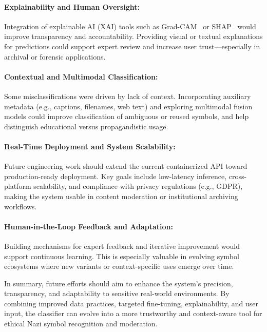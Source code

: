 \paragraph{Explainability and Human Oversight:}
Integration of explainable AI (XAI) tools such as
\ac{Grad-CAM}~\parencite{Selvaraju_2019} or \ac{SHAP}~\parencite{SHAP2025} would improve transparency and
accountability. Providing visual or textual explanations for predictions could support expert review and
increase user trust—especially in archival or forensic applications.

\paragraph{Contextual and Multimodal Classification:}
Some misclassifications were driven by lack of context.
Incorporating auxiliary metadata (e.g., captions, filenames, web text) and exploring multimodal fusion models
could improve classification of ambiguous or reused symbols, and help distinguish educational versus
propagandistic usage.

\paragraph{Real-Time Deployment and System Scalability:}
Future engineering work should extend the current
containerized \ac{API} toward production-ready deployment. Key goals include low-latency inference,
cross-platform scalability, and compliance with privacy regulations (e.g., GDPR), making the system usable in
content moderation or institutional archiving workflows.

\paragraph{Human-in-the-Loop Feedback and Adaptation:}
Building mechanisms for expert feedback and iterative
improvement would support continuous learning. This is especially valuable in evolving symbol ecosystems where
new variants or context-specific uses emerge over time.


In summary, future efforts should aim to enhance the system’s precision, transparency, and adaptability to sensitive real-world environments. By combining improved data practices, targeted fine-tuning, explainability, and user input, the classifier can evolve into a more trustworthy and context-aware tool for ethical Nazi symbol recognition and moderation.

